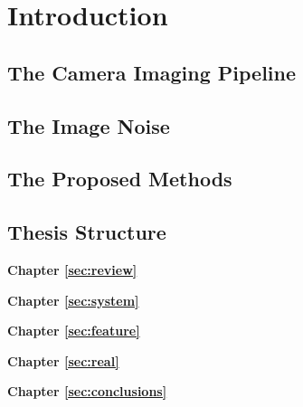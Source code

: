 %
\chapter{Introduction}
\label{sec:intro}


\blindtext

\section{The Camera Imaging Pipeline}
\label{sec:intro:general}

\blindtext

\section{The Image Noise}
\label{sec:intro:current}

\blindtext

\section{The Proposed Methods}
\label{sec:intro:new}

\blindtext

\section{Thesis Structure}
\label{sec:intro:structure}

\textbf{Chapter \ref{sec:review}} \\[0.2em]
\blindtext

\textbf{Chapter \ref{sec:system}} \\[0.2em]
\blindtext

\textbf{Chapter \ref{sec:feature}} \\[0.2em]
\blindtext

\textbf{Chapter \ref{sec:real}} \\[0.2em]
\blindtext

\textbf{Chapter \ref{sec:conclusions}} \\[0.2em]
\blindtext
